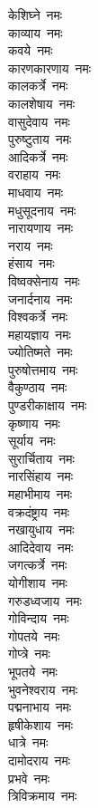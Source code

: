 \begin{multicols}{2}
\begin{flushleft}
केशिघ्ने~नमः\\
काव्याय~नमः\\
कवये~नमः\\
कारणकारणाय~नमः\hfill{}\\
कालकर्त्रे~नमः\\
कालशेषाय~नमः\\
वासुदेवाय~नमः\\
पुरुष्टुताय~नमः\\
आदिकर्त्रे~नमः\\
वराहाय~नमः\\
माधवाय~नमः\\
मधुसूदनाय~नमः\\
नारायणाय~नमः\\
नराय~नमः\hfill{}\\
हंसाय~नमः\\
विष्वक्सेनाय~नमः\\
जनार्दनाय~नमः\\
विश्वकर्त्रे~नमः\\
महायज्ञाय~नमः\\
ज्योतिष्मते~नमः\\
पुरुषोत्तमाय~नमः\\
वैकुण्ठाय~नमः\\
पुण्डरीकाक्षाय~नमः\\
कृष्णाय~नमः\hfill{}\\
सूर्याय~नमः\\
सुरार्चिताय~नमः\\
नारसिंहाय~नमः\\
महाभीमाय~नमः\\
वक्रदंष्ट्राय~नमः\\
नखायुधाय~नमः\\
आदिदेवाय~नमः\\
जगत्कर्त्रे~नमः\\
योगीशाय~नमः\\
गरुडध्वजाय~नमः\hfill{}\\
गोविन्दाय~नमः\\
गोपतये~नमः\\
गोप्त्रे~नमः\\
भूपतये~नमः\\
भुवनेश्वराय~नमः\\
पद्मनाभाय~नमः\\
हृषीकेशाय~नमः\\
धात्रे~नमः\\
दामोदराय~नमः\\
प्रभवे~नमः\hfill{}\\
त्रिविक्रमाय~नमः\\

\end{flushleft}
\end{multicols}
